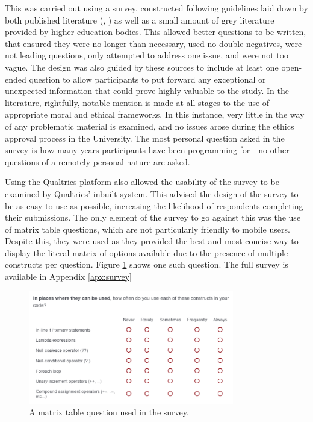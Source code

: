\documentclass{article}
\begin{document}
        This was carried out using a survey, constructed following guidelines laid down by both published literature (\cite{goodSurveys1}, \cite{goodSurveys2}) as well as a small amount of grey literature provided by higher education bodies. This allowed better questions to be written, that ensured they were no longer than necessary, used no double negatives, were not leading questions, only attempted to address one issue, and were not too vague. The design was also guided by these sources to include at least one open-ended question to allow participants to put forward any exceptional or unexpected information that could prove highly valuable to the study. In the literature, rightfully, notable mention is made at all stages to the use of appropriate moral and ethical frameworks. In this instance, very little in the way of any problematic material is examined, and no issues arose during the ethics approval process in the University. The most personal question asked in the survey is how many years participants have been programming for - no other questions of a remotely personal nature are asked.

        Using the Qualtrics platform also allowed the usability of the survey to be examined by Qualtrics' inbuilt system. This advised the design of the survey to be as easy to use as possible, increasing the likelihood of respondents completing their submissions. The only element of the survey to go against this was the use of matrix table questions, which are not particularly friendly to mobile users. Despite this, they were used as they provided the best and most concise way to display the literal matrix of options available due to the presence of multiple constructs per question. Figure \ref{fig:matrixTable} shows one such question. The full survey is available in Appendix \ref{apx:survey}
        
        \begin{figure}[htbp]
            \centering
            \includegraphics[width=0.8\textwidth]{matrixTable}
            \caption{A matrix table question used in the survey.}
            \label{fig:matrixTable}
        \end{figure}
\end{document}
